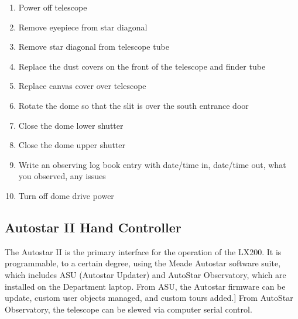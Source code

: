\documentclass[12pt,titlepage]{article}
\begin{document}
\begin{enumerate}
	\label{enum:quickshutdown_start}
	\item Power off telescope
	\item Remove eyepiece from star diagonal
	\item Remove star diagonal from telescope tube
	\item Replace the dust covers on the front of the telescope and finder tube
	\item Replace canvas cover over telescope
	\item Rotate the dome so that the slit is over the south entrance door
	\item Close the dome lower shutter
	\item Close the dome upper shutter
	\item Write an observing log book entry with date/time in, date/time out, what you observed, any issues
	\item Turn off dome drive power
	\label{enum:quickshutdown_end}
\end{enumerate}


\subsection{Autostar II Hand Controller}
The Autostar II is the primary interface for the operation of the LX200.
It is programmable, to a certain degree, using the Meade Autostar software suite, which includes ASU (Autostar Updater) and AutoStar Observatory, which are installed on the Department laptop.
From ASU, the Autostar firmware can be update, custom user objects managed, and custom tours added.]
From AutoStar Observatory, the telescope can be slewed via computer serial control.
\end{document}
